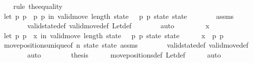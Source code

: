 \begin{isabellebody}
\ \ \isamarkupfalse%
\ {\isacharparenleft}rule\ the{\isacharunderscore}equality{\isacharparenright}\isanewline
\ \ \ \ \isamarkupfalse%
\ {\isachardoublequoteopen}let\ {\isacharparenleft}p{}{\isacharprime}{\isacharcomma}\ p{}{\isacharprime}{\isacharparenright}\ {\isacharequal}\ {\isacharparenleft}p{}{\isacharcomma}\ p{}{\isacharparenright}\ in\ valid{\isacharunderscore}move{\isacharprime}\ {\isacharparenleft}length\ state\ {\isacharminus}\ {}{\isacharparenright}\ p{}{\isacharprime}\ p{}{\isacharprime}\ state\ state{\isacharprime}{\isachardoublequoteclose}\isanewline
\ \ \ \ \ \ \isamarkupfalse%
\ assms\isanewline
\ \ \ \ \ \ \isamarkupfalse%
\ valid{\isacharunderscore}state{\isacharunderscore}def\ valid{\isacharunderscore}move{\isacharunderscore}def\ Let{\isacharunderscore}def\isanewline
\ \ \ \ \ \ \isamarkupfalse%
\ auto\isanewline
\ \ \isamarkupfalse%
\isanewline
\ \ \ \ \isamarkupfalse%
\ x\isanewline
\ \ \ \ \isamarkupfalse%
\ {\isachardoublequoteopen}let\ {\isacharparenleft}p{}{\isacharprime}{\isacharcomma}\ p{}{\isacharprime}{\isacharparenright}\ {\isacharequal}\ x\ in\ valid{\isacharunderscore}move{\isacharprime}\ {\isacharparenleft}length\ state\ {\isacharminus}\ {}{\isacharparenright}\ p{}{\isacharprime}\ p{}{\isacharprime}\ state\ state{\isacharprime}{\isachardoublequoteclose}\isanewline
\ \ \ \ \isamarkupfalse%
\ {\isachardoublequoteopen}x\ {\isacharequal}\ {\isacharparenleft}p{}{\isacharcomma}\ p{}{\isacharparenright}{\isachardoublequoteclose}\isanewline
\ \ \ \ \ \ \isamarkupfalse%
\ move{\isacharunderscore}positions{\isacharunderscore}unique{\isacharbrackleft}of\ n\ state\ state{\isacharprime}{\isacharbrackright}\ assms\isanewline
\ \ \ \ \ \ \isamarkupfalse%
\ valid{\isacharunderscore}state{\isacharunderscore}def\ valid{\isacharunderscore}move{\isacharunderscore}def\isanewline
\ \ \ \ \ \ \isamarkupfalse%
\ auto\isanewline
\ \ \isamarkupfalse%
\isanewline
\ \ \isamarkupfalse%
\ \isamarkupfalse%
\ {\isacharquery}thesis\isanewline
\ \ \ \ \isamarkupfalse%
\ move{\isacharunderscore}positions{\isacharunderscore}def\ Let{\isacharunderscore}def\isanewline
\ \ \ \ \isamarkupfalse%
\ auto\isanewline

\end{isabellebody}
